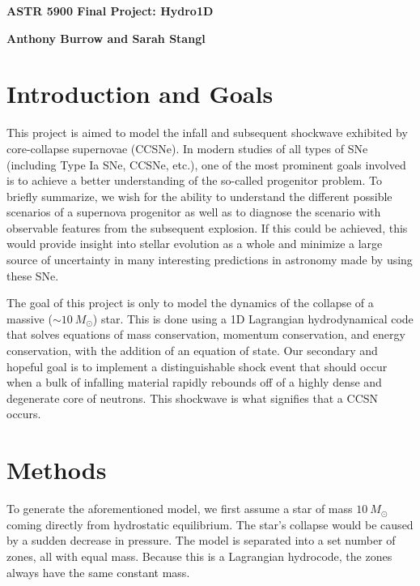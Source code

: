 \documentclass[12pt]{article}
\begin{document}
\begin{center}\begin{LARGE}
\textbf{ASTR 5900 Final Project: Hydro1D}
\end{LARGE}\end{center}

\begin{center}
\textbf{Anthony Burrow and Sarah Stangl}
\end{center}

\section{Introduction and Goals}

This project is aimed to model the infall and subsequent shockwave exhibited by
core-collapse supernovae (CCSNe). In modern studies of all types of SNe
(including Type Ia SNe, CCSNe, etc.), one of the most prominent goals involved
is to achieve a better understanding of the so-called progenitor problem. To
briefly summarize, we wish for the ability to understand the different possible
scenarios of a supernova progenitor as well as to diagnose the scenario with
observable features from the subsequent explosion. If this could be achieved,
this would provide insight into stellar evolution as a whole and minimize a
large source of uncertainty in many interesting predictions in astronomy made
by using these SNe.

The goal of this project is only to model the dynamics of the collapse of a
massive ($\sim10\ M_\odot$) star. This is done using a 1D Lagrangian
hydrodynamical code that solves equations of mass conservation, momentum
conservation, and energy conservation, with the addition of an equation of
state. Our secondary and hopeful goal is to implement a distinguishable shock event
that should occur when a bulk of infalling material rapidly rebounds off of a
highly dense and degenerate core of neutrons. This shockwave is what signifies that a CCSN occurs.

\section{Methods}

To generate the aforementioned model, we first assume a star of mass
$10\ M_\odot$ coming directly from hydrostatic equilibrium. The star's collapse
would be caused by a sudden decrease in pressure. The model is separated into a
set number of zones, all with equal mass. Because this is a Lagrangian
hydrocode, the zones always have the same constant mass.
\end{document}
